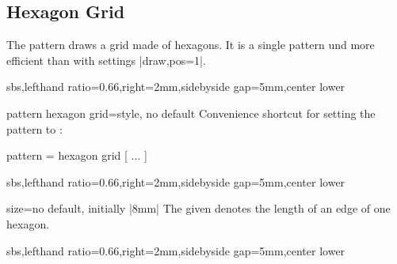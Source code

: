 \documentclass[a4paper,11pt]{article}
\begin{document}
\clearpage
\subsection{Hexagon Grid}
The  pattern draws a grid made of hexagons. It is
a single pattern und more efficient than  with settings |draw,pos=1|.

\begin{dispExample*}{sbs,lefthand ratio=0.66,right=2mm,sidebyside gap=5mm,center lower}
\end{dispExample*}


\begin{docTikzKey}{pattern hexagon grid}{=}{style, no default}
  Convenience shortcut for setting the pattern to :
\begin{dispListing}
  pattern = { hexagon grid [ ... ] }
\end{dispListing}
\begin{dispExample*}{sbs,lefthand ratio=0.66,right=2mm,sidebyside gap=5mm,center lower}
\end{dispExample*}
\end{docTikzKey}



\begin{docPatternKey}{size}{=}{no default, initially |8mm|}
  The given  denotes the length of an edge of one hexagon.
\begin{dispExample*}{sbs,lefthand ratio=0.66,right=2mm,sidebyside gap=5mm,center lower}
\end{dispExample*}
\end{docPatternKey}
\end{document}
